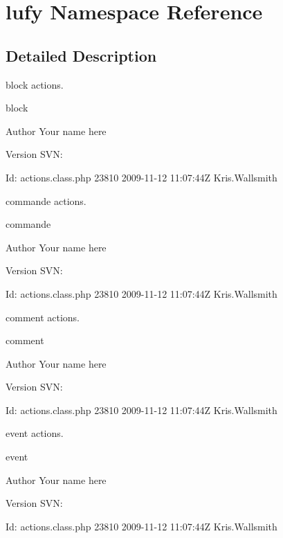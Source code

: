 \hypertarget{namespacelufy}{\section{lufy Namespace Reference}
\label{namespacelufy}
}


\subsection{Detailed Description}
block actions.

block \begin{DoxyAuthor}{Author}
Your name here 
\end{DoxyAuthor}
\begin{DoxyVersion}{Version}
S\-V\-N\-: 
\end{DoxyVersion}
\begin{DoxyParagraph}{Id\-:}
actions.\-class.\-php 23810 2009-\/11-\/12 11\-:07\-:44\-Z Kris.\-Wallsmith 
\end{DoxyParagraph}


commande actions.

commande \begin{DoxyAuthor}{Author}
Your name here 
\end{DoxyAuthor}
\begin{DoxyVersion}{Version}
S\-V\-N\-: 
\end{DoxyVersion}
\begin{DoxyParagraph}{Id\-:}
actions.\-class.\-php 23810 2009-\/11-\/12 11\-:07\-:44\-Z Kris.\-Wallsmith 
\end{DoxyParagraph}


comment actions.

comment \begin{DoxyAuthor}{Author}
Your name here 
\end{DoxyAuthor}
\begin{DoxyVersion}{Version}
S\-V\-N\-: 
\end{DoxyVersion}
\begin{DoxyParagraph}{Id\-:}
actions.\-class.\-php 23810 2009-\/11-\/12 11\-:07\-:44\-Z Kris.\-Wallsmith 
\end{DoxyParagraph}


event actions.

event \begin{DoxyAuthor}{Author}
Your name here 
\end{DoxyAuthor}
\begin{DoxyVersion}{Version}
S\-V\-N\-: 
\end{DoxyVersion}
\begin{DoxyParagraph}{Id\-:}
actions.\-class.\-php 23810 2009-\/11-\/12 11\-:07\-:44\-Z Kris.\-Wallsmith 
\end{DoxyParagraph}


